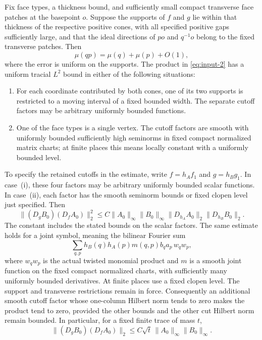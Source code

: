 \begin{proposition}
\label{prop:transfer-transverse}
Fix face types, a thickness bound, and sufficiently small compact
transverse face patches at the basepoint $o$. Suppose the supports of
$f$ and $g$ lie within that thickness of the respective positive cones,
with all specified positive gaps sufficiently large, and that the
ideal directions of $po$ and $q^{-1}o$ belong to the fixed transverse
patches. Then
\[
 \mu(qp)=\mu(q)+\mu(p)+O(1),
\]
where the error is uniform on the supports. The product in
\eqref{eq:input-2} has a uniform tracial $L^2$ bound in either of the
following situations:
\begin{enumerate}[label=\textup{(\roman*)}]
\item For each coordinate contributed by both cones, one of its two
supports is restricted to a moving interval of a fixed bounded width.
The separate cutoff factors may be arbitrary uniformly bounded
functions.
\item One of the face types is a single vertex. The cutoff factors are
smooth with uniformly bounded sufficiently high seminorms in fixed
compact normalized matrix charts; at finite places this means locally
constant with a uniformly bounded level.
\end{enumerate}
To specify the retained cutoffs in the estimate, write
$f=h_Af_1$ and $g=h_Bg_1$. In case~\textup{(i)}, these four
factors may be arbitrary uniformly bounded scalar functions. In
case~\textup{(ii)}, each factor has the smooth seminorm bounds or
fixed clopen level just specified. Then
\begin{equation}
 \big\|(D_gB_0)(D_fA_0)\big\|_2^2
 \leq C\|A_0\|_\infty\|B_0\|_\infty
       \|D_{h_A}A_0\|_2\|D_{h_B}B_0\|_2.
 \label{eq:transfer-homogeneous}
\end{equation}
The constant includes the stated bounds on the scalar factors.
The same estimate holds for a joint symbol, meaning the bilinear
Fourier sum
\[
 \sum_{q,p}h_B(q)h_A(p)m(q,p)b_qa_p\,w_qw_p,
\]
where $w_qw_p$ is the actual twisted monomial product and $m$ is a
smooth joint function on the fixed compact normalized charts, with
sufficiently many uniformly bounded derivatives. At finite places use
a fixed clopen level. The support and transverse restrictions remain
in force. Consequently an
additional smooth cutoff factor whose one-column Hilbert norm tends
to zero makes the product tend to zero, provided the other bounds and
the other cut Hilbert norm remain bounded. In particular, for a fixed
finite trace of mass $t$,
\[
 \big\|(D_gB_0)(D_fA_0)\big\|_2
 \leq C\sqrt t\,\|A_0\|_\infty\|B_0\|_\infty.
\]
\end{proposition}

